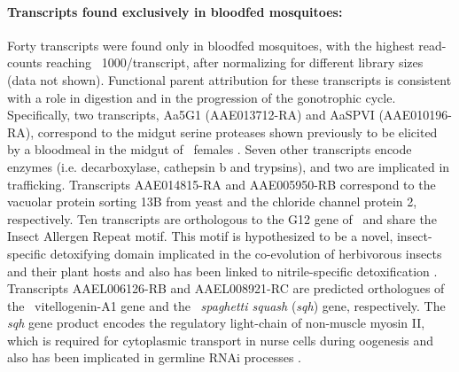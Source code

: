 \paragraph*{Transcripts found exclusively in bloodfed mosquitoes:}
Forty transcripts were found only in bloodfed mosquitoes, with the highest read-counts reaching ~1000/transcript, after normalizing for different library sizes (data not shown). Functional parent attribution for these transcripts is consistent with a role in digestion and in the progression of the gonotrophic cycle. Specifically, two transcripts, Aa5G1 (AAE013712-RA) and AaSPVI (AAE010196-RA), correspond to the midgut serine proteases shown previously to be elicited by a bloodmeal in the midgut of \Aa\  females \cite{Brackney2010}. Seven other transcripts encode enzymes (i.e. decarboxylase, cathepsin b and trypsins), and two are implicated in trafficking. Transcripts AAE014815-RA and AAE005950-RB correspond to the vacuolar protein sorting 13B from yeast and the chloride channel protein 2, respectively. Ten transcripts are orthologous to the G12 gene of \Ag\ and share the Insect Allergen Repeat motif. This motif is hypothesized to be a novel, insect-specific detoxifying domain implicated in the co-evolution of herbivorous insects and their plant hosts and also has been linked to nitrile-specific detoxification \cite{Fischer2008}. Transcripts AAEL006126-RB and AAEL008921-RC are predicted orthologues of the \Cxq\ vitellogenin-A1 gene and the \Dmel\ \textit{spaghetti squash} (\textit{sqh}) gene, respectively. The \textit{sqh} gene product encodes the regulatory light-chain of non-muscle myosin II, which is required for cytoplasmic transport in nurse cells during oogenesis and also has been implicated in germline \gls{RNAi} processes \cite{Pane2007}.

